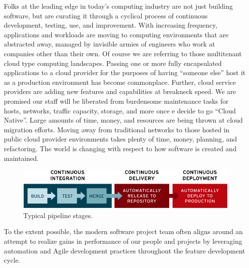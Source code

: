 \justify{}
Folks at the leading edge in today's computing industry are not just building
software, but are curating it through a cyclical process of continuous development,
testing, use, and improvement. With increasing frequency, applications and
workloads are moving to computing environments that are abstracted away, managed
by invisible armies of engineers who work at companies other than their own. Of course
we are referring to those multitenant cloud type computing landscapes. Passing
one or more fully encapsulated applications to a cloud provider for the purposes
of having ``someone else'' host it as a production environment has become
commonplace. Further, cloud service providers are adding new features and capabilities
at breakneck speed. We are promised our staff will be liberated from burdensome
maintenance tasks for hosts, networks, traffic capacity, storage, and more once
e decide to go ``Cloud Native''. Large amounts of time,
money, and resources are being thrown at cloud migration efforts. Moving away
from traditional networks to those hosted in public
cloud provider environments takes plenty of time, money, planning, and refactoring.
The world is changing with respect to how software is created and maintained.

\begin{figure}[!htb]
	\centering
	\includegraphics[scale=0.35]{../images/ci-cd-flow-desktop_0.png}
	\caption{Typical pipeline stages.}
	\label{stages}
\end{figure}

\justify{}
To the extent possible, the modern software project team often aligns around an
attempt to realize gains in performance of our people and projects by
leveraging automation and Agile development practices throughout the
feature development cycle.


